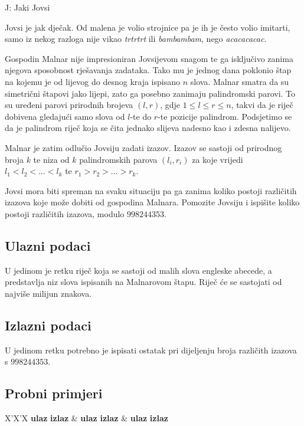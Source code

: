\begin{statement}[
  timelimit=1 s,
  memorylimit=512 MiB,
]{J: Jaki Jovsi}

Jovsi je jak dječak. Od malena je volio strojnice pa je ih je često volio
imitarti, samo iz nekog razloga nije vikao \textit{trtrtrt} ili
\textit{bambambam}, nego \textit{acacacacac}.

Gospodin Malnar nije impresioniran Jovsijevom snagom te ga isključivo zanima
njegova sposobnost
rješavanja zadataka. Tako mu je jednog dana poklonio štap na kojemu je od
lijevog do desnog kraja ispisano $n$ slova. Malnar smatra da su simetrični
štapovi jako lijepi, zato ga posebno zanimaju palindromski parovi. To su uređeni
parovi prirodnih brojeva $(l, r)$, gdje $1 \le l \le r \le n$, takvi da je riječ
dobivena gledajući samo slova od $l$-te do $r$-te pozicije palindrom.
Podsjetimo se da je palindrom riječ koja se čita jednako slijeva nadesno kao i
zdesna nalijevo.

Malnar je zatim odlučio Jovsiju zadati izazov. Izazov se sastoji od prirodnog
broja $k$ te niza od $k$ palindromskih parova $(l_i, r_i)$ za koje vrijedi
$l_1 < l_2 < \dots < l_k$ te $r_1 > r_2 > \dots > r_k$.

Jovsi mora biti spreman na svaku situaciju pa ga zanima koliko postoji
različitih izazova koje može dobiti od gospodina Malnara. Pomozite Jovsiju i
ispišite koliko postoji različitih izazova, modulo $998244353$.

\subsection*{Ulazni podaci}
U jedinom je retku riječ koja se sastoji od malih slova engleske abecede, a
predstavlja niz slova ispisanih na Malnarovom štapu. Riječ će se sastojati
od najviše milijun znakova.

\subsection*{Izlazni podaci}
U jedinom retku potrebno je ispisati ostatak pri dijeljenju broja različith
izazova s $998244353$.

\subsection*{Probni primjeri}
\begin{tabularx}{\textwidth}{X'X'X}
  \textbf{ulaz}
  \linespread{1}{}
  \textbf{izlaz}
  \linespread{1}{} &
  \textbf{ulaz}
  \linespread{1}{}
  \textbf{izlaz}
  \linespread{1}{} &
  \textbf{ulaz}
  \linespread{1}{}
  \textbf{izlaz}
  \linespread{1}{}
\end{tabularx}


\end{statement}

